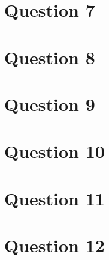 \documentclass{article}
\begin{document}
	\section{Question 7}
	\section{Question 8}
	\section{Question 9}
	\section{Question 10}
	\section{Question 11}
	\section{Question 12}
  
\end{document}
